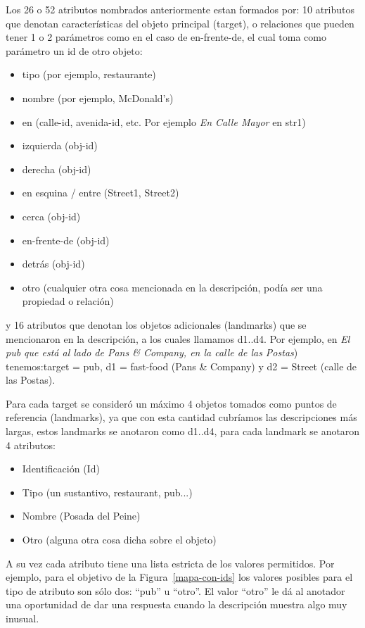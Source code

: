 Los 26 o 52 atributos nombrados anteriormente estan formados por:
10 atributos que denotan caracter\'isticas del objeto principal (target), o relaciones que pueden tener 1 o 2 par\'ametros como en el caso de en-frente-de, el cual toma como par\'ametro un id de otro objeto:
\begin{itemize}
  \item tipo (por ejemplo, restaurante)
  \item nombre (por ejemplo, McDonald's)
  \item en (calle-id, avenida-id, etc. Por ejemplo {\it En Calle Mayor} en str1)
  \item izquierda (obj-id)
  \item derecha (obj-id)
  \item en esquina / entre (Street1, Street2)
  \item cerca (obj-id)
  \item en-frente-de (obj-id)
  \item detr\'as (obj-id)
  \item otro (cualquier otra cosa mencionada en la descripci\'on, pod\'ia ser una propiedad o relaci\'on)
\end{itemize}
y 16 atributos que denotan los objetos adicionales (landmarks) que se mencionaron en la descripci\'on, a los cuales llamamos d1..d4. Por ejemplo, en {\it El pub que est\'a al lado de Pans \& Company, en la calle de las Postas}) tenemos:target = pub, d1 = fast-food (Pans \& Company) y d2 = Street (calle de las Postas).

Para cada target se consider\'o un m\'aximo 4 objetos tomados como puntos de referencia (landmarks), ya que con esta cantidad cubr\'iamos las descripciones m\'as largas, estos landmarks se anotaron como d1..d4, para cada landmark se anotaron 4 atributos:
\begin{itemize}
  \item Identificaci\'on (Id)
  \item Tipo (un sustantivo, restaurant, pub...)
  \item Nombre (Posada del Peine)
  \item Otro (alguna otra cosa dicha sobre el objeto)
\end{itemize}

A su vez cada atributo tiene una lista estricta de los valores permitidos. Por ejemplo, para el objetivo de la Figura~\ref{mapa-con-ids} los valores posibles para el tipo de atributo son s\'olo dos: ``pub'' u ``otro''. El valor ``otro'' le d\'a al anotador una oportunidad de dar una respuesta cuando la descripci\'on muestra algo muy inusual.

